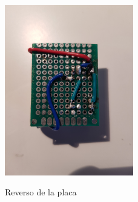 \documentclass{article}
\begin{document}
\begin{figure}
\center
\includegraphics[width=0.5\textwidth]{imagenes/reverso.jpg}
\label{fig:reverso}
\caption{Reverso de la placa}
\end{figure}
\end{document}
